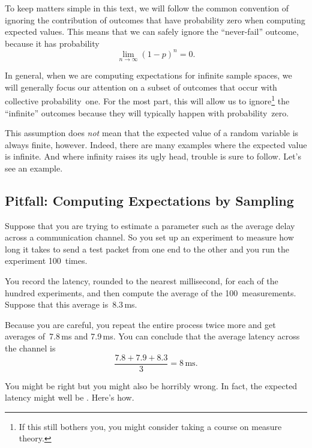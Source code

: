 To keep matters simple in this text, we will follow the common
convention of ignoring the contribution of outcomes that have
probability zero when computing expected values.  This means that we
can safely ignore the ``never-fail'' outcome, because it has
probability
\begin{equation*}
    \lim_{n \to \infty} (1 - p)^n = 0.
\end{equation*}

In general, when we are computing expectations for infinite sample
spaces, we will generally focus our attention on a subset of outcomes
that occur with collective probability~one.  For the most part, this
will allow us to ignore\footnote{If this still bothers you, you might
  consider taking a course on measure theory.} the ``infinite''
outcomes because they will typically happen with probability~zero.

This assumption does \emph{not} mean that the expected value of a
random variable is always finite, however.  Indeed, there are many
examples where the expected value is infinite.  And where infinity
raises its ugly head, trouble is sure to follow.  Let's see an
example.

\subsection{Pitfall: Computing Expectations by Sampling}
\label{sec:latency}

Suppose that you are trying to estimate a parameter such as the
average delay across a communication channel.  So you set up an
experiment to measure how long it takes to send a test packet from one
end to the other and you run the experiment 100~times.

You record the latency, rounded to the nearest millisecond, for each
of the hundred experiments, and then compute the average of the
100~measurements.  Suppose that this average is~8.3\,ms.

Because you are careful, you repeat the entire process twice more and
get averages of~7.8\,ms and 7.9\,ms.  You can conclude that the
average latency across the channel is
\begin{equation*}
    \frac{7.8 + 7.9 + 8.3}{3} = 8\,\mathrm{ms}.
\end{equation*}

You might be right but you might also be horribly wrong.  In fact, the
expected latency might well be .  Here's how.

